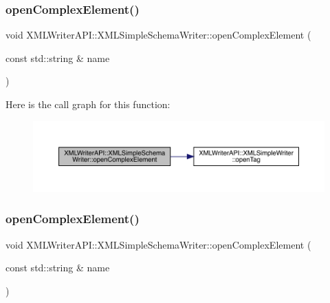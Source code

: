 \subsubsection{\texorpdfstring{openComplexElement()}{openComplexElement()}\hspace{0.1cm}{\footnotesize\ttfamily [2/3]}}
{\footnotesize\ttfamily void X\+M\+L\+Writer\+A\+P\+I\+::\+X\+M\+L\+Simple\+Schema\+Writer\+::open\+Complex\+Element (\begin{DoxyParamCaption}\item[{const std\+::string \&}]{name }\end{DoxyParamCaption})\hspace{0.3cm}{\ttfamily [inline]}}

Here is the call graph for this function\+:
\nopagebreak
\begin{figure}[H]
\begin{center}
\leavevmode
\includegraphics[width=350pt]{db/d0b/classXMLWriterAPI_1_1XMLSimpleSchemaWriter_a136a57c1860b0baa0fd6b877f4dce4bc_cgraph}
\end{center}
\end{figure}
\mbox{\label{classXMLWriterAPI_1_1XMLSimpleSchemaWriter_a136a57c1860b0baa0fd6b877f4dce4bc}} 
\subsubsection{\texorpdfstring{openComplexElement()}{openComplexElement()}\hspace{0.1cm}{\footnotesize\ttfamily [3/3]}}
{\footnotesize\ttfamily void X\+M\+L\+Writer\+A\+P\+I\+::\+X\+M\+L\+Simple\+Schema\+Writer\+::open\+Complex\+Element (\begin{DoxyParamCaption}\item[{const std\+::string \&}]{name }\end{DoxyParamCaption})\hspace{0.3cm}{\ttfamily [inline]}}

